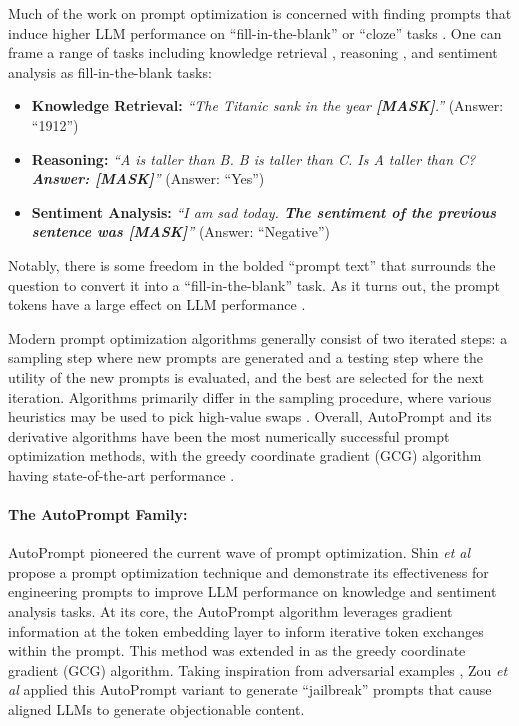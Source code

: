 \documentclass{article} %
\begin{document}
Much of the work on prompt optimization is concerned with finding prompts that induce higher LLM performance on ``fill-in-the-blank'' or ``cloze'' tasks \citep{cloze_1959}. 
One can frame a range of tasks including knowledge retrieval \citep{LAMA_dataset}, reasoning \citep{babl_dataset_reasoning}, and sentiment analysis \citep{wang2023chatgpt} as fill-in-the-blank tasks: 
\begin{itemize}
    \item \textbf{Knowledge Retrieval: } \textit{``The Titanic sank in the year \textbf{[MASK]}.''} (Answer: ``1912'')
    \item \textbf{Reasoning: } \textit{``A is taller than B. B is taller than C. Is A taller than C? \textbf{Answer: [MASK]}''} (Answer: ``Yes'')
    \item \textbf{Sentiment Analysis: } \textit{``I am sad today. \textbf{The sentiment of the previous sentence was [MASK]}''} (Answer: ``Negative'')
\end{itemize}

Notably, there is some freedom in the bolded ``prompt text'' that surrounds the question to convert it into a ``fill-in-the-blank'' task. As it turns out, the prompt tokens have a large effect on LLM performance \citep{gpt3, survey_controllable_text_gen, jiang2020know}.

Modern prompt optimization algorithms generally consist of two iterated steps: a sampling step where new prompts are generated and a testing step where the utility of the new prompts is evaluated, and the best are selected for the next iteration. 
Algorithms primarily differ in the sampling procedure, where various heuristics may be used to pick high-value swaps \citep{wen2023hard, zhou2023large, reynolds2021prompt}.  
Overall, AutoPrompt and its derivative algorithms have been the most numerically successful prompt optimization methods, with the greedy coordinate gradient (GCG) algorithm having state-of-the-art performance \citep{zou2023universal}. 


\paragraph{The AutoPrompt Family: } AutoPrompt \citep{shin2020autoprompt} pioneered the current wave of prompt optimization. 
Shin \textit{et al} propose a prompt optimization technique and demonstrate its effectiveness for engineering prompts to improve LLM performance on knowledge and sentiment analysis tasks. 
At its core, the AutoPrompt algorithm leverages gradient information at the token embedding layer to inform iterative token exchanges within the prompt. 
This method was extended in \cite{zou2023universal} as the greedy coordinate gradient (GCG) algorithm. Taking inspiration from adversarial examples \citep{goodfellow2015explaining}, Zou \textit{et al} applied this AutoPrompt variant to generate ``jailbreak'' prompts that cause aligned LLMs to generate objectionable content. 
\end{document}
